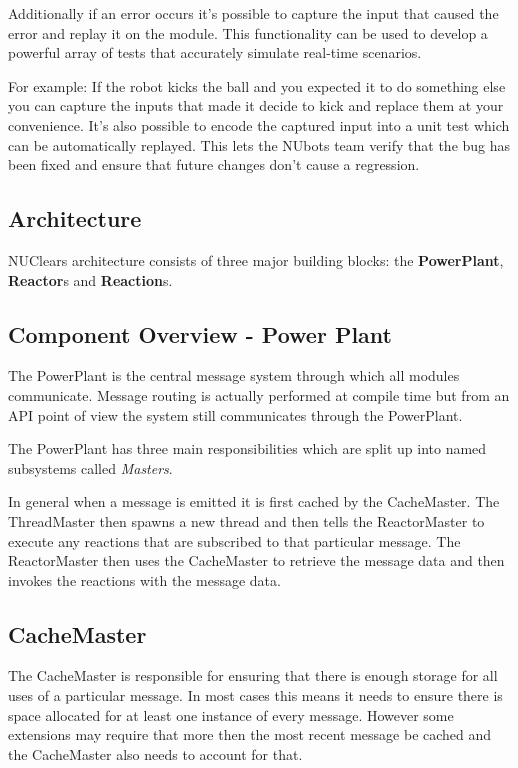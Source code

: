 \documentclass[english,12pt]{scrartcl}
\begin{document}
				Additionally if an error occurs it's possible to capture the input that caused the error and replay it on the module. 
				This functionality can be used to develop a powerful array of tests that accurately simulate real-time scenarios.
				
				For example: If the robot kicks the ball and you expected it to do something else you can capture the inputs that made it decide to kick and replace them at your convenience. 
				It's also possible to encode the captured input into a unit test which can be automatically replayed. 
				This lets the NUbots team verify that the bug has been fixed and ensure that future changes don't cause a regression.
		
		\subsection{Architecture}
			NUClears architecture consists of three major building blocks: the \textbf{PowerPlant}, \textbf{Reactor}s and \textbf{Reaction}s. 
		
		\subsection{Component Overview - Power Plant}
			The PowerPlant is the central message system through which all modules communicate. 
			Message routing is actually performed at compile time but from an API point of view the system still communicates through the PowerPlant.
			
			The PowerPlant has three main responsibilities which are split up into named subsystems called \emph{Masters}.
			
			In general when a message is emitted it is first cached by the CacheMaster. 
			The ThreadMaster then spawns a new thread and then tells the ReactorMaster to execute any reactions that are subscribed to that particular message. 
			The ReactorMaster then uses the CacheMaster to retrieve the message data and then invokes the reactions with the message data.
	
			\subsection{CacheMaster}
				The CacheMaster is responsible for ensuring that there is enough storage for all uses of a particular message.
				In most cases this means it needs to ensure there is space allocated for at least one instance of every message.
				However some extensions may require that more then the most recent message be cached and the CacheMaster also needs to account for that.
				
\end{document}
